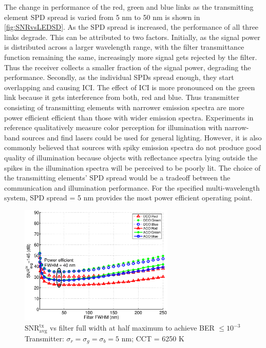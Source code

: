 The change in performance of the red, green and blue links as the transmitting element SPD spread is varied from 5 nm to 50 nm is shown in \figurename{\ref{fig:SNRvsLEDSD}}. As the SPD spread is increased, the performance of all three links degrade. This can be attributed to two factors. Initially, as the signal power is distributed across a larger wavelength range, with the filter transmittance function remaining the same, increasingly more signal gets rejected by the filter. Thus the receiver collects a smaller fraction of the signal power, degrading the performance. Secondly, as the individual SPDs spread enough, they start overlapping and causing ICI. The effect of ICI is more pronounced on the green link because it gets interference from both, red and blue. Thus transmitter consisting of transmitting elements with narrower emission spectra are more power efficient efficient than those with wider emission spectra. Experiments in reference \cite{neu11a} qualitatively measure color perception for illumination with narrow-band sources and find lasers could be used for general lighting. However, it is also commonly believed that sources with spiky emission spectra do not produce good quality of illumination because objects with reflectance spectra lying outside the spikes in the illumination spectra will be perceived to be poorly lit. The choice of the transmitting elements' SPD spread would be a tradeoff between the communication and illumination performance. For the specified multi-wavelength system, SPD spread = 5 nm provides the most power efficient operating point.

\begin{figure}[!t]
	\centering
		\includegraphics[trim={0.15in 0.05in 0.05in 0.35in}, clip=true, width=2.9in]{img/SNRvsFLTWID.eps}
	\caption{$\text{SNR}^{\text{tx}}_{\text{avg}}$ vs filter full width at half maximum to achieve BER $\leq 10^{-3}$\newline Transmitter: $\sigma_r = \sigma_g = \sigma_b = 5$ nm; CCT = 6250 K}
	\label{fig:SNRvsFLTWID}
\end{figure}

